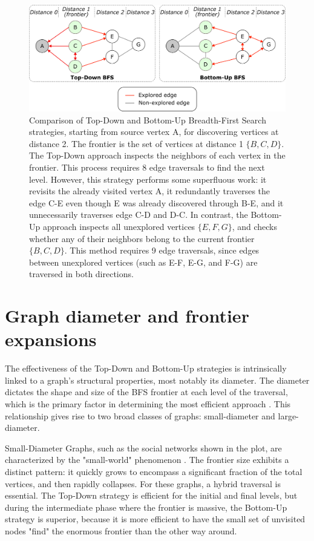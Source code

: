 \begin{figure}[h]
    \centering
    \includegraphics[width=0.8\linewidth]{images/hybrid bfs.png}
    \caption{Comparison of Top-Down and Bottom-Up Breadth-First Search strategies, starting from source vertex A, for discovering vertices at distance 2. The frontier is the set of vertices at distance 1 $\{B, C, D\}$. The Top-Down approach inspects the neighbors of each vertex in the frontier. This process requires 8 edge traversals to find the next level. However, this strategy performs some superfluous work: it revisits the already visited vertex A, it redundantly traverses the edge C-E even though E was already discovered through B-E, and it unnecessarily traverses edge C-D  and D-C. In contrast, the Bottom-Up approach inspects all unexplored vertices $\{E,F,G\}$, and checks whether any of their neighbors belong to the current frontier $\{B,C,D\}$. This method requires 9 edge traversals, since edges between unexplored vertices (such as E-F, E-G, and F-G) are traversed in both directions.}
    \label{fig:hybrid_bfs}
\end{figure}

\section{Graph diameter and frontier expansions}
The effectiveness of the Top-Down and Bottom-Up strategies is intrinsically linked to a graph's structural properties, most notably its diameter. The diameter dictates the shape and size of the BFS frontier at each level of the traversal, which is the primary factor in determining the most efficient approach \cite{beamer2013direction, andaloro2025cache, arai2024doubling}. This relationship gives rise to two broad classes of graphs: small-diameter and large-diameter.

Small-Diameter Graphs, such as the social networks shown in the plot, are characterized by the "small-world" phenomenon \cite{amaral2000classes}. The frontier size exhibits a distinct pattern: it quickly grows to encompass a significant fraction of the total vertices, and then rapidly collapses. For these graphs, a hybrid traversal is essential. The Top-Down strategy is efficient for the initial and final levels, but during the intermediate phase where the frontier is massive, the Bottom-Up strategy is superior, because it is more efficient to have the small set of unvisited nodes "find" the enormous frontier than the other way around.

